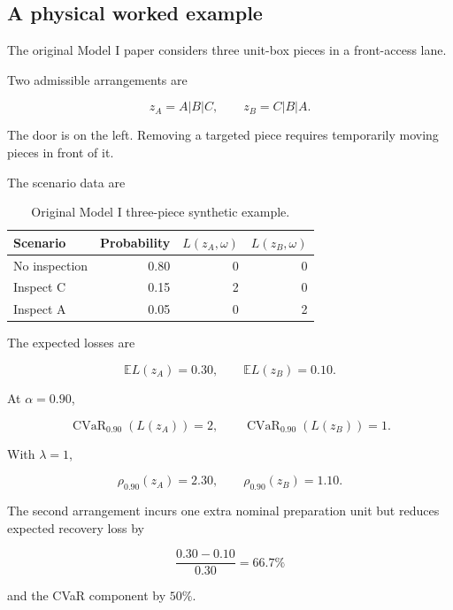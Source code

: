 \documentclass[10pt,a4paper]{article}
\DeclareMathOperator{\CVaR}{CVaR}
\newcommand{\EE}{\mathbb{E}}
\theoremstyle{plain}
\theoremstyle{definition}
\theoremstyle{remark}
\begin{document}
\subsection{A physical worked example}

The original Model I paper considers
three unit-box pieces in a front-access lane.

Two admissible arrangements are

\[
z_A=A|B|C,
\qquad
z_B=C|B|A.
\]

The door is on the left.
Removing a targeted piece requires
temporarily moving pieces in front of it.

The scenario data are

\begin{table}[!htbp]
\centering
\caption{
Original Model I three-piece synthetic example.
}
\small
\begin{tabular}{@{}lrrr@{}}
\toprule
Scenario & Probability &
\(L(z_A,\omega)\) &
\(L(z_B,\omega)\) \\
\midrule
No inspection & 0.80 & 0 & 0 \\
Inspect C & 0.15 & 2 & 0 \\
Inspect A & 0.05 & 0 & 2 \\
\bottomrule
\end{tabular}
\end{table}

The expected losses are

\[
\EE L(z_A)=0.30,
\qquad
\EE L(z_B)=0.10.
\]

At \(\alpha=0.90\),

\[
\CVaR_{0.90}(L(z_A))=2,
\qquad
\CVaR_{0.90}(L(z_B))=1.
\]

With \(\lambda=1\),

\[
\rho_{0.90}(z_A)=2.30,
\qquad
\rho_{0.90}(z_B)=1.10.
\]

The second arrangement incurs one extra
nominal preparation unit
but reduces expected recovery loss by

\[
\frac{0.30-0.10}{0.30}
=
\boxed{66.7\%}
\]

and the CVaR component by \(50\%\).
\end{document}
